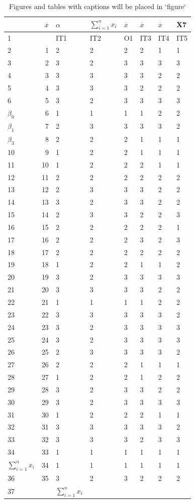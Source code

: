 \documentclass[10pt,]{krantz}
\theoremstyle{definition}
\theoremstyle{definition}
\theoremstyle{definition}
\theoremstyle{definition}
\theoremstyle{remark}
\begin{document}
\begin{longtable}[t]{lrllllll}
\caption{\label{tab:unnamed-chunk-45}Figures and tables with captions will be placed in `figure`}\\
\toprule
  & $\overline{x}$ & $\alpha$ & $\sum^{n}_{i=1}{x_i}$ & $\overline{x}$ & $\overline{x}$ & $\overline{x}$ & X7\\
\midrule
1 &  & IT1 & IT2 & O1 & IT3 & IT4 & IT5\\
2 & 1 & 2 & 2 & 2 & 2 & 1 & 1\\
3 & 2 & 3 & 2 & 3 & 3 & 3 & 3\\
4 & 3 & 3 & 3 & 3 & 3 & 2 & 2\\
5 & 4 & 3 & 3 & 3 & 2 & 2 & 2\\
6 & 5 & 3 & 2 & 3 & 3 & 3 & 3\\
$\beta_0$ & 6 & 1 & 1 & 1 & 1 & 2 & 2\\
$\beta_1$ & 7 & 2 & 3 & 3 & 3 & 3 & 2\\
$\beta_3$ & 8 & 2 & 2 & 2 & 1 & 1 & 1\\
10 & 9 & 1 & 2 & 2 & 1 & 1 & 1\\
11 & 10 & 1 & 2 & 2 & 2 & 1 & 1\\
12 & 11 & 2 & 2 & 2 & 2 & 2 & 2\\
13 & 12 & 2 & 3 & 3 & 3 & 2 & 2\\
14 & 13 & 3 & 2 & 3 & 3 & 2 & 2\\
15 & 14 & 2 & 3 & 3 & 2 & 2 & 3\\
16 & 15 & 2 & 2 & 2 & 2 & 2 & 1\\
17 & 16 & 2 & 2 & 2 & 3 & 2 & 3\\
18 & 17 & 2 & 2 & 2 & 2 & 2 & 2\\
19 & 18 & 1 & 2 & 2 & 1 & 1 & 2\\
20 & 19 & 3 & 2 & 3 & 3 & 3 & 3\\
21 & 20 & 3 & 3 & 3 & 3 & 2 & 2\\
22 & 21 & 1 & 1 & 1 & 1 & 2 & 2\\
23 & 22 & 3 & 3 & 3 & 3 & 3 & 2\\
24 & 23 & 3 & 2 & 3 & 3 & 3 & 3\\
25 & 24 & 3 & 2 & 3 & 3 & 3 & 3\\
26 & 25 & 2 & 3 & 3 & 3 & 3 & 2\\
27 & 26 & 2 & 2 & 2 & 1 & 1 & 1\\
28 & 27 & 1 & 2 & 2 & 1 & 2 & 2\\
29 & 28 & 3 & 2 & 3 & 3 & 2 & 2\\
30 & 29 & 3 & 2 & 3 & 3 & 3 & 3\\
31 & 30 & 1 & 2 & 2 & 2 & 1 & 1\\
32 & 31 & 3 & 3 & 3 & 3 & 3 & 2\\
33 & 32 & 3 & 3 & 3 & 2 & 3 & 3\\
34 & 33 & 1 & 1 & 1 & 1 & 1 & 1\\
$\sum^{n}_{i=1}{x_i}$ & 34 & 1 & 1 & 1 & 1 & 1 & 1\\
36 & 35 & 3 & 2 & 3 & 2 & 2 & 2\\
37 &  & $\sum_{i=1}^nx_i$ &  &  &  &  & \\
\bottomrule
\end{longtable}



\printindex
\end{document}
